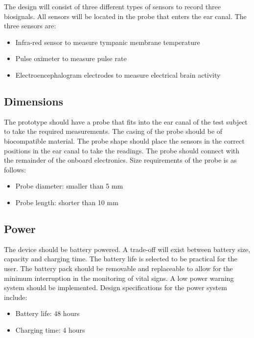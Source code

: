 The design will consist of three different types of sensors to record three biosignals. All sensors will be located in the probe that enters the ear canal. The three sensors are:
\begin{itemize}
  \item Infra-red sensor to measure tympanic membrane temperature
  \item Pulse oximeter to measure pulse rate
  \item Electroencephalogram electrodes to measure electrical brain activity
\end{itemize}

\subsection{Dimensions}
The prototype should have a probe that fits into the ear canal of the test subject to take the required measurements. The casing of the probe should be of biocompatible material. The probe shape should place the sensors in the correct positions in the ear canal to take the readings. The probe should connect with the remainder of the onboard electronics. Size requirements of the probe is as follows:
\begin{itemize}
  \item Probe diameter: smaller than 5 mm
  \item Probe length: shorter than 10 mm
\end{itemize}

\subsection{Power}
The device should be battery powered. A trade-off will exist between battery size, capacity and charging time. The battery life is selected to be practical for the user. The battery pack should be removable and replaceable to allow for the minimum interruption in the monitoring of vital signs. A low power warning system should be implemented. Design specifications for the power system include:
\begin{itemize}
  \item Battery life: 48 hours
  \item Charging time: 4 hours
\end{itemize}

